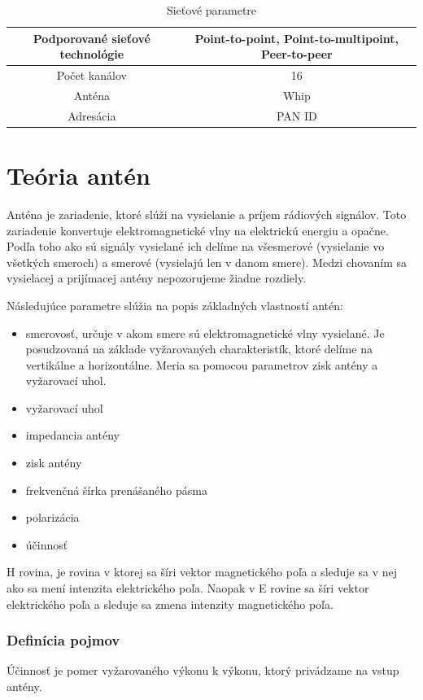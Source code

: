 \documentclass[11pt,twoside,a4paper]{book}
\begin{document}
\begin{table}[htbp]
\begin{center}
\begin{tabular}{|c|c|}
\hline Podporované sieťové technológie & Point-to-point, Point-to-multipoint, Peer-to-peer \\ 
\hline Počet kanálov & 16 \\ 
\hline Anténa & Whip \\
\hline Adresácia & PAN ID \\ 
\hline 
\end{tabular}
\end{center}
\caption{Sieťové parametre}
\label{tab:tab2}
\end{table}

\chapter{Teória antén}
Anténa je zariadenie, ktoré slúži na vysielanie a príjem rádiových signálov. Toto zariadenie konvertuje elektromagnetické vlny na elektrickú energiu a opačne. Podľa toho ako sú signály vysielané ich delíme na všesmerové (vysielanie vo všetkých smeroch) a smerové (vysielajú len v danom smere). Medzi chovaním sa vysielacej a prijímacej antény nepozorujeme žiadne rozdiely.

Následujúce parametre slúžia na popis základných vlastností antén:
\begin{itemize}
 \item smerovosť, určuje v akom smere sú elektromagnetické vlny vysielané. Je posudzovaná na základe vyžarovaných charakteristík, ktoré delíme na vertikálne a horizontálne. Meria sa pomocou parametrov zisk antény a vyžarovací uhol.
 \item vyžarovací uhol
 \item impedancia antény 
 \item zisk antény
 \item frekvenčná šírka prenášaného pásma
 \item polarizácia
 \item účinnosť
\end{itemize}

H rovina, je rovina v ktorej sa šíri vektor magnetického poľa a sleduje sa v nej ako sa mení intenzita elektrického poľa. Naopak v E rovine sa šíri vektor elektrického poľa a sleduje sa zmena intenzity magnetického poľa.

\subsection{Definícia pojmov}
Účinnosť je pomer vyžarovaného výkonu k výkonu, ktorý privádzame na vstup antény.
\linebreak 
\end{document}
